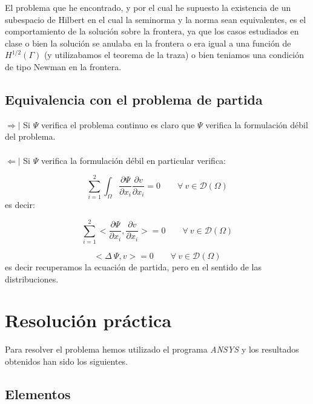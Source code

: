 \documentclass[a4paper,11pt]{article}
\begin{document}
\newpage

El problema que he encontrado, y por el cual he supuesto la existencia de un
subespacio de Hilbert en el cual la seminorma y la norma sean equivalentes, es
el comportamiento de la soluci\'on sobre la frontera, ya que los casos
estudiados en clase o bien la soluci\'on se anulaba en la frontera o era igual
a una funci\'on de $H^{1/2}(\Gamma )$ (y utilizabamos el teorema de la traza) o
bien teniamos una condici\'on de tipo Newman en la frontera.

\subsection{Equivalencia con el problema de partida}

$\Rightarrow |$ Si $\Psi $ verifica el problema continuo es claro que $\Psi $
verifica la formulaci\'on d\'ebil del problema.\\ \\
$\Leftarrow |$ Si $\Psi $ verifica la formulaci\'on d\'ebil en particular
verifica:

\begin{displaymath}
\sum_{i=1}^2 \int_{\Omega } \frac{\partial \Psi}{\partial x_i}
\frac{\partial v}{\partial x_i} = 0\qquad \forall \ v \in \mathcal{D}(\Omega )
\end{displaymath}
es decir:

\begin{displaymath}
\sum_{i=1}^2 <\frac{\partial \Psi}{\partial x_i},
\frac{\partial v}{\partial x_i}> = 0\qquad \forall \ v \in \mathcal{D}(\Omega )
\end{displaymath}

\begin{displaymath}
<\Delta \ \Psi,v> = 0\qquad \forall \ v \in \mathcal{D}(\Omega )
\end{displaymath}
es decir recuperamos la ecuaci\'on de partida, pero en el sentido de las
distribuciones.

\newpage

\section{Resoluci\'on pr\'actica}

Para resolver el problema hemos utilizado el programa \emph{ANSYS} y los
resultados obtenidos han sido los siguientes.

\subsection{Elementos}
\end{document}

